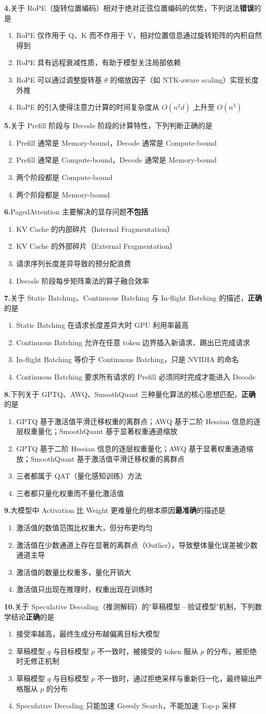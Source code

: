 \documentclass[11pt,a4paper]{article}
\newcommand{\qitem}[2]{%
  \noindent\textbf{#1.}\;#2\par
  \vspace{0.3em}
}
\newcommand{\fourchoices}[4]{%
  \begin{enumerate}[label=(\Alph*),leftmargin=2.2em,itemsep=0pt,parsep=0pt,topsep=0pt]
    \setlength{\itemindent}{0pt}
    \item #1
    \item #2
    \item #3
    \item #4
  \end{enumerate}
  \vspace{0.4em}
}
\begin{document}
\qitem{4}{关于 RoPE（旋转位置编码）相对于绝对正弦位置编码的优势，下列说法\textbf{错误}的是}{}
\fourchoices{RoPE 仅作用于 Q、K 而不作用于 V，相对位置信息通过旋转矩阵的内积自然得到}{RoPE 具有远程衰减性质，有助于模型关注局部依赖}{RoPE 可以通过调整旋转基 $\theta$ 的缩放因子（如 NTK-aware scaling）实现长度外推}{RoPE 的引入使得注意力计算的时间复杂度从 $O(n^2 d)$ 上升至 $O(n^3)$}

\qitem{5}{关于 Prefill 阶段与 Decode 阶段的计算特性，下列判断正确的是}{}
\fourchoices{Prefill 通常是 Memory-bound，Decode 通常是 Compute-bound}{Prefill 通常是 Compute-bound，Decode 通常是 Memory-bound}{两个阶段都是 Compute-bound}{两个阶段都是 Memory-bound}

\qitem{6}{PagedAttention 主要解决的显存问题\textbf{不包括}}{}
\fourchoices{KV Cache 的内部碎片（Internal Fragmentation）}{KV Cache 的外部碎片（External Fragmentation）}{请求序列长度差异导致的预分配浪费}{Decode 阶段每步矩阵乘法的算子融合效率}

\qitem{7}{关于 Static Batching、Continuous Batching 与 In-flight Batching 的描述，\textbf{正确}的是}{}
\fourchoices{Static Batching 在请求长度差异大时 GPU 利用率最高}{Continuous Batching 允许在任意 token 边界插入新请求、踢出已完成请求}{In-flight Batching 等价于 Continuous Batching，只是 NVIDIA 的命名}{Continuous Batching 要求所有请求的 Prefill 必须同时完成才能进入 Decode}

\qitem{8}{下列关于 GPTQ、AWQ、SmoothQuant 三种量化算法的核心思想匹配，\textbf{正确}的是}{}
\fourchoices{GPTQ 基于激活值平滑迁移权重的离群点；AWQ 基于二阶 Hessian 信息的逐层权重量化；SmoothQuant 基于显著权重通道缩放}{GPTQ 基于二阶 Hessian 信息的逐层权重量化；AWQ 基于显著权重通道缩放；SmoothQuant 基于激活值平滑迁移权重的离群点}{三者都属于 QAT（量化感知训练）方法}{三者都只量化权重而不量化激活值}

\qitem{9}{大模型中 Activation 比 Weight 更难量化的根本原因\textbf{最准确}的描述是}{}
\fourchoices{激活值的数值范围比权重大，但分布更均匀}{激活值在少数通道上存在显著的离群点（Outlier），导致整体量化误差被少数通道主导}{激活值的数量比权重多，量化开销大}{激活值只出现在推理时，权重出现在训练时}

\qitem{10}{关于 Speculative Decoding（推测解码）的"草稿模型—验证模型"机制，下列数学结论\textbf{正确}的是}{}
\fourchoices{接受率越高，最终生成分布越偏离目标大模型}{草稿模型 $q$ 与目标模型 $p$ 不一致时，被接受的 token 服从 $p$ 的分布，被拒绝时无修正机制}{草稿模型 $q$ 与目标模型 $p$ 不一致时，通过拒绝采样与重新归一化，最终输出严格服从 $p$ 的分布}{Speculative Decoding 只能加速 Greedy Search，不能加速 Top-p 采样}
\end{document}
